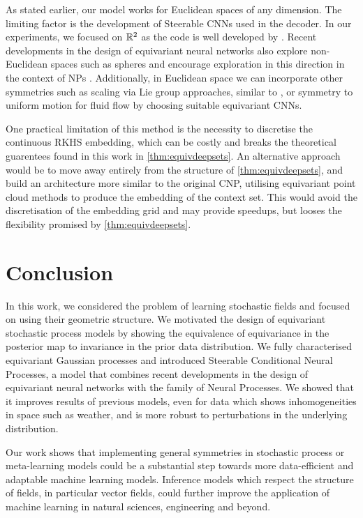 As stated earlier, our model works for Euclidean spaces of any dimension.
The limiting factor is the development of Steerable CNNs used in the decoder.
In our experiments, we focused on $\mathbb{R}^2$ as the code is well developed by \textcite{E2Steerable}.
Recent developments in the design of equivariant neural networks also explore non-Euclidean spaces such as spheres and encourage exploration in this direction in the context of NPs \parencite{Homogenous_spaces,SphericalCNNs,SphericalVFs}.
Additionally, in Euclidean space we can incorporate other symmetries such as scaling via Lie group approaches, similar to \parencite{EquivCNPs}, or symmetry to uniform motion for fluid flow \parencite{wang2020incorporating} by choosing suitable equivariant CNNs.

One practical limitation of this method is the necessity to discretise the continuous RKHS embedding, which can be costly and breaks the theoretical guarentees found in this work in \cref{thm:equivdeepsets}.
An alternative approach would be to move away entirely from the structure of \cref{thm:equivdeepsets}, and build an architecture more similar to the original CNP, utilising equivariant point cloud methods \parencite{finzi2020generalizing, hutchinson2020lietransformer, satorras2021n} to produce the embedding of the context set.
This would avoid the discretisation of the embedding grid and may provide speedups, but looses the flexibility promised by \cref{thm:equivdeepsets}.

\section{Conclusion}
\label{sec:conclusion}
In this work, we considered the problem of learning stochastic fields and focused on using their geometric structure.
We motivated the design of equivariant stochastic process models by showing the equivalence of equivariance in the posterior map to invariance in the prior data distribution.
We fully characterised equivariant Gaussian processes and introduced Steerable Conditional Neural Processes, a model that combines recent developments in the design of equivariant neural networks with the family of Neural Processes.
We showed that it improves results of previous models, even for data which shows inhomogeneities in space such as weather, and is more robust to perturbations in the underlying distribution.

Our work shows that implementing general symmetries in stochastic process or meta-learning models could be a substantial step towards more data-efficient and adaptable machine learning models.
Inference models which respect the structure of fields, in particular vector fields, could further improve the application of machine learning in natural sciences, engineering and beyond.
